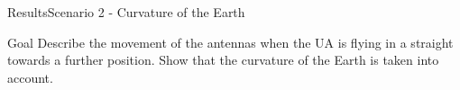 
\begin{frame}{Results}{Scenario 2 - Curvature of the Earth}

  \begin{block}{Goal}
	Describe the movement of the antennas when the UA is flying in a straight towards a further position.
	Show that the curvature of the Earth is taken into account.
  \end{block}

  \begin{figure}[H]
    \centerline{
    \hfill
    }
  \end{figure}

\end{frame}



